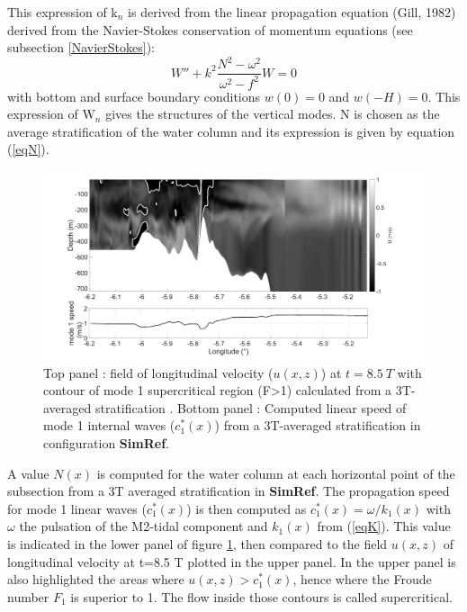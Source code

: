 This expression of k$_n$ is derived from the linear propagation equation (Gill, 1982) derived from the Navier-Stokes conservation of momentum equations (see subsection \ref{NavierStokes}):
\begin{equation}
 W'' + k^2 \frac{N^2 - \omega^2}{\omega ^2 - f^2}W = 0
\end{equation}
with bottom and surface boundary conditions $w(0) = 0$ and $w(-H) = 0$. This expression of W$_n$ gives the structures of the vertical modes. N is chosen as the average stratification of the water column and its expression is given by equation (\ref{eqN}). 

\begin{figure}[!h]
\centering
\includegraphics[width=1\linewidth]{./papier2D/comp_fn_strat.png}
\caption{Top panel : field of longitudinal velocity ($u (x,z)$) at $t = 8.5\ T$ with contour of mode 1 supercritical region (F>1) calculated from a 3T-averaged stratification . Bottom panel : Computed linear speed of mode 1 internal waves ($c^*_1 (x)$) from a 3T-averaged stratification in configuration \textbf{SimRef}.}
\label{fig_annexeF}
\end{figure}

 A value $N (x)$ is computed for the water column at each horizontal point of the subsection from a 3T averaged stratification in \textbf{SimRef}. The propagation speed for mode 1 linear waves ($c^*_1 (x)$) is then computed as $c^*_1 (x) =\omega / k_1 (x)$ with $\omega$ the pulsation of the M2-tidal component and $k_1 (x)$ from (\ref{eqK}). This value is indicated in the lower panel of figure \ref{fig_annexeF}, then compared to the field $u(x,z)$ of longitudinal velocity at t=8.5 T plotted in the upper panel. In the upper panel is also highlighted the areas where $u(x,z) > c^*_1 (x)$, hence where the Froude number $F_1$ is superior to 1. The flow inside those contours is called supercritical.

